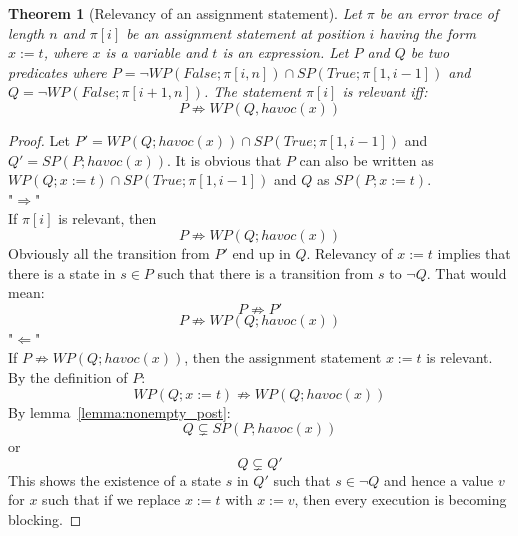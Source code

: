 \documentclass{article}
\newcommand{\limp}{\Rightarrow}
\newtheorem{theorem}{Theorem}
\begin{document}
\begin{theorem}[Relevancy of an assignment statement]\label{mydef:relevancytheorem}
Let $\pi$ be an error trace of length $n$ and $\pi[i]$ be an assignment statement at position $i$ having the form $x:=t$, where $x$ is a variable and $t$ is an expression. Let $P$ and $Q$ be two predicates where $P = \neg WP(False; \pi[i,n]) \cap SP(True; \pi[1,i-1])$ and $Q =  \neg WP(False; \pi[i+1,n])$. The statement $\pi[i]$ is relevant iff:
 $$P \not \limp WP(Q,havoc(x))$$
\end{theorem}

\begin{proof}
Let $P' = WP(Q;havoc(x)) \cap SP(True; \pi[1,i-1])$ and $Q'=SP(P;havoc(x))$. It is obvious that $P$ can also be written as $WP(Q;x:=t) \cap SP(True; \pi[1,i-1])$ and $Q$ as $SP(P;x:=t)$.\\
"$\Rightarrow$"\\
If $\pi[i]$ is relevant, then\\
$$P \not \limp WP(Q;havoc(x))$$
Obviously all the transition from $P'$ end up in $Q$. Relevancy of $x:=t$ implies that there is a state in $s \in P$ such that there is a transition from $s$ to $\neg Q$. That would mean:
$$P \not \limp P'$$
$$P \not \limp WP(Q;havoc(x))$$
"$\Leftarrow$"\\
If $P \not \limp WP(Q;havoc(x))$, then the assignment statement $x:=t$ is relevant.\\
By the definition of $P$:
$$WP(Q; x:=t) \not \limp WP(Q; havoc(x))$$
By lemma~\ref{lemma:nonempty_post}:
$$Q \subsetneq SP(P; havoc(x)) $$
or
$$Q \subsetneq Q'$$
This shows the existence of a state $s$ in $Q'$ such that $s\in \neg Q$ and hence a value $v$ for $x$ such that if we replace $x:=t$ with $x:=v$, then every execution is becoming blocking.


\end{proof}
\end{document}
